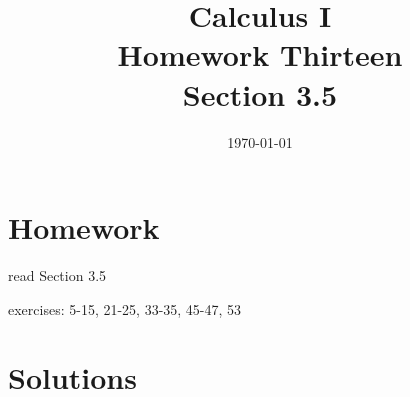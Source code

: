 \documentclass[letterpaper]{exam}
\title{Calculus I \\ Homework Thirteen \\ Section 3.5}
\author{}
\date{\today}
\begin{document}
  \maketitle

  \section{Homework}
    \begin{itemize*}
      \item read Section 3.5
      \item exercises: 5-15, 21-25, 33-35, 45-47, 53
    \end{itemize*}

  \ifprintanswers

  \section{Solutions}
\end{document}
